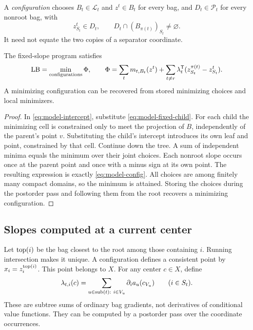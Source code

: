 A \emph{configuration} chooses $B_t\in\mathcal L_t$ and $z^t\in B_t$
for every bag, and $D_t\in\mathcal P_t$ for every nonroot bag, with
\[
 z^t_{S_t}\in D_t,\qquad D_t\cap(B_{\pi(t)})_{S_t}\ne\varnothing.
\]
It need not equate the two copies of a separator coordinate.
\begin{proposition}\label{prop:model-dp}
The fixed-slope program satisfies
\begin{equation}\label{eq:model-config}
 \mathrm{LB}=\min_{\text{configurations}}\Phi,\qquad
 \Phi=\sum_t m_{t,B_t}(z^t)+
 \sum_{t\ne r}\lambda_t^{\mathsf T}
       (z^{\pi(t)}_{S_t}-z^t_{S_t}).
\end{equation}
A minimizing configuration can be recovered from stored minimizing
choices and local minimizers.
\end{proposition}
\begin{proof}
In \eqref{eq:model-intercept}, substitute \eqref{eq:model-fixed-child}.
For each child the minimizing cell is constrained only to meet the
projection of $B$, independently of the parent's point $v$. Substituting
the child's intercept introduces its own leaf and point, constrained by
that cell. Continue down the tree. A sum of independent minima equals
the minimum over their joint choices. Each nonroot slope occurs once
at the parent point and once with a minus sign at its own point.
The resulting expression is exactly \eqref{eq:model-config}. All choices
are among finitely many compact domains, so the minimum is attained.
Storing the choices during the postorder pass and following them from
the root recovers a minimizing configuration.
\end{proof}

\subsection{Slopes computed at a current center}
Let $\operatorname{top}(i)$ be the bag closest to the root among those containing
$i$. Running intersection makes it unique. A configuration defines a
consistent point by $x_i=z_i^{\operatorname{top}(i)}$. This point belongs to $X$.
For any center $c\in X$, define
\begin{equation}\label{eq:model-slope}
 \lambda_{t,i}(c)=
 \sum_{u\in\operatorname{sub}(t):\ i\in V_u}\partial_i a_u(c_{V_u})
 \qquad(i\in S_t).
\end{equation}
These are subtree sums of ordinary bag gradients, not derivatives of
conditional value functions. They can be computed by a postorder pass
over the coordinate occurrences.

